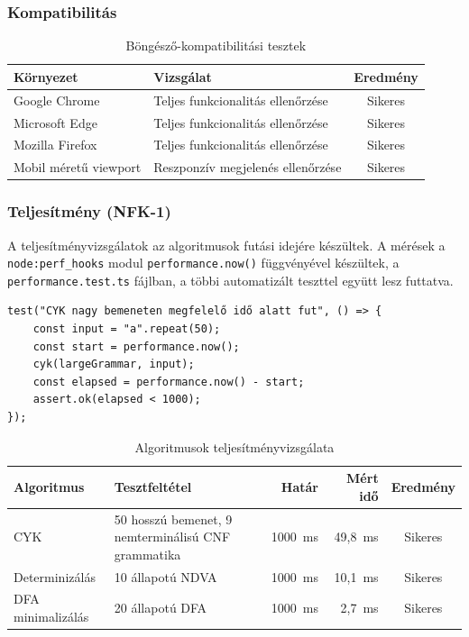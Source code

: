 \subsubsection{Kompatibilitás}
\begin{table}[H] \centering \small \begin{tabularx}{\textwidth}{|l|X|c|} \hline \textbf{Környezet} & \textbf{Vizsgálat} & \textbf{Eredmény} \\ \hline Google Chrome & Teljes funkcionalitás ellenőrzése & Sikeres \\ \hline Microsoft Edge & Teljes funkcionalitás ellenőrzése & Sikeres \\ \hline Mozilla Firefox & Teljes funkcionalitás ellenőrzése & Sikeres \\ \hline Mobil méretű viewport & Reszponzív megjelenés ellenőrzése & Sikeres \\ \hline \end{tabularx} \caption{Böngésző-kompatibilitási tesztek} \label{tab:browser-compatibility} \end{table}
  \subsubsection{Teljesítmény (NFK-1)}

A teljesítményvizsgálatok
az algoritmusok futási idejére készültek. A mérések a \texttt{node:perf\_hooks}
modul \texttt{performance.now()} függvényével készültek, a \texttt{performance.test.ts}
fájlban, a többi automatizált teszttel együtt lesz futtatva.

\begin{lstlisting}
test("CYK nagy bemeneten megfelelő idő alatt fut", () => {
    const input = "a".repeat(50);
    const start = performance.now();
    cyk(largeGrammar, input);
    const elapsed = performance.now() - start;
    assert.ok(elapsed < 1000);
});
\end{lstlisting}

\begin{table}[H]
    \centering
    \begin{tabularx}{\textwidth}{|l|X|r|r|c|}
        \hline
        \textbf{Algoritmus} & \textbf{Tesztfeltétel} & \textbf{Határ} & \textbf{Mért idő} & \textbf{Eredmény} \\ \hline
        CYK & 50 hosszú bemenet, 9 nemterminálisú CNF grammatika & 1000~ms & 49{,}8~ms & Sikeres \\ \hline
        Determinizálás & 10 állapotú NDVA & 1000~ms & 10{,}1~ms & Sikeres \\ \hline
        DFA minimalizálás & 20 állapotú DFA & 1000~ms & 2{,}7~ms & Sikeres \\ \hline
    \end{tabularx}
    \caption{Algoritmusok teljesítményvizsgálata}
    \label{tab:performance}
\end{table}
